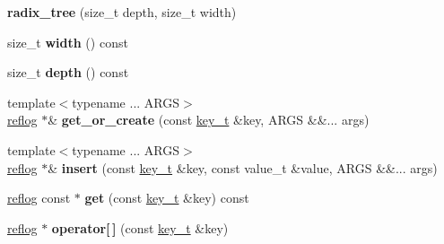 \begin{DoxyCompactItemize}
\item 
\mbox{\label{classdialog_1_1index_1_1radix__tree_a346ba110c09cc087d49659d806425d7a}} 
{\bfseries radix\+\_\+tree} (size\+\_\+t depth, size\+\_\+t width)
\item 
\mbox{\label{classdialog_1_1index_1_1radix__tree_ae219a6d4008450de31bc4784802fd84c}} 
size\+\_\+t {\bfseries width} () const
\item 
\mbox{\label{classdialog_1_1index_1_1radix__tree_aada7501fdd88e18f99e04a3a35e4038b}} 
size\+\_\+t {\bfseries depth} () const
\item 
\mbox{\label{classdialog_1_1index_1_1radix__tree_ad2e65fc7487e741e1339f4c7402348a6}} 
{\footnotesize template$<$typename ... A\+R\+GS$>$ }\\\hyperlink{classdialog_1_1monolog_1_1monolog__exp2__linear}{reflog} $\ast$\& {\bfseries get\+\_\+or\+\_\+create} (const \hyperlink{classdialog_1_1byte__string}{key\+\_\+t} \&key, A\+R\+GS \&\&... args)
\item 
\mbox{\label{classdialog_1_1index_1_1radix__tree_a07ff353f8a9eba5d557d8373f74fdb47}} 
{\footnotesize template$<$typename ... A\+R\+GS$>$ }\\\hyperlink{classdialog_1_1monolog_1_1monolog__exp2__linear}{reflog} $\ast$\& {\bfseries insert} (const \hyperlink{classdialog_1_1byte__string}{key\+\_\+t} \&key, const value\+\_\+t \&value, A\+R\+GS \&\&... args)
\item 
\mbox{\label{classdialog_1_1index_1_1radix__tree_a2d637ae6eea61e95584234fb9a44db94}} 
\hyperlink{classdialog_1_1monolog_1_1monolog__exp2__linear}{reflog} const  $\ast$ {\bfseries get} (const \hyperlink{classdialog_1_1byte__string}{key\+\_\+t} \&key) const
\item 
\mbox{\label{classdialog_1_1index_1_1radix__tree_ac6ca64025f76405f306fc7aa90074481}} 
\hyperlink{classdialog_1_1monolog_1_1monolog__exp2__linear}{reflog} $\ast$ {\bfseries operator\mbox{[}$\,$\mbox{]}} (const \hyperlink{classdialog_1_1byte__string}{key\+\_\+t} \&key)

\end{DoxyCompactItemize}
